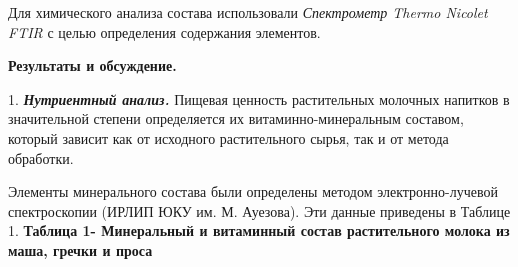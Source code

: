 Для химического анализа состава использовали \emph{Спектрометр Thermo
Nicolet FTIR} с целью определения содержания элементов.

{\bfseries Результаты и обсуждение.~}


1. \emph{{\bfseries Нутриентный анализ.}} Пищевая ценность растительных
молочных напитков в
значительной степени определяется их витаминно-минеральным составом,
который зависит как от исходного растительного сырья, так и от метода
обработки.

Элементы минерального состава были определены методом электронно-лучевой
спектроскопии (ИРЛИП ЮКУ им. М. Ауезова). Эти данные приведены в Таблице
1. {\bfseries Таблица 1- Минеральный и витаминный состав растительного молока
из маша, гречки и проса}


